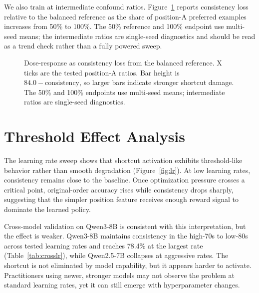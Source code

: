 \documentclass[letterpaper]{article}
\begin{document}
We also train at intermediate confound ratios. Figure~\ref{fig:dose} reports consistency loss relative to the balanced reference as the share of position-A preferred examples increases from 50\% to 100\%. The 50\% reference and 100\% endpoint use multi-seed means; the intermediate ratios are single-seed diagnostics and should be read as a trend check rather than a fully powered sweep.

\begin{figure}[htbp]
\centering
{}
\caption{Dose-response as consistency loss from the balanced reference. X ticks are the tested position-A ratios. Bar height is $84.0-\text{consistency}$, so larger bars indicate stronger shortcut damage. The 50\% and 100\% endpoints use multi-seed means; intermediate ratios are single-seed diagnostics.}
\label{fig:dose}
\end{figure}

\section{Threshold Effect Analysis}
\label{app:threshold}

The learning rate sweep shows that shortcut activation exhibits threshold-like behavior rather than smooth degradation (Figure~\ref{fig:lr}). At low learning rates, consistency remains close to the baseline. Once optimization pressure crosses a critical point, original-order accuracy rises while consistency drops sharply, suggesting that the simpler position feature receives enough reward signal to dominate the learned policy.

Cross-model validation on Qwen3-8B is consistent with this interpretation, but the effect is weaker. Qwen3-8B maintains consistency in the high-70s to low-80s across tested learning rates and reaches 78.4\% at the largest rate (Table~\ref{tab:crosslr}), while Qwen2.5-7B collapses at aggressive rates. The shortcut is not eliminated by model capability, but it appears harder to activate. Practitioners using newer, stronger models may not observe the problem at standard learning rates, yet it can still emerge with hyperparameter changes.


\end{document}
